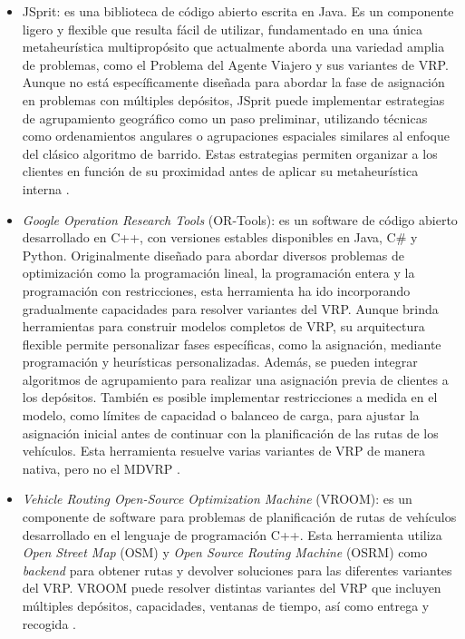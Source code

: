 \begin{itemize}
  \item JSprit: es una biblioteca de código abierto escrita en Java. Es un componente ligero y flexible que resulta fácil de utilizar, fundamentado en una única metaheurística multipropósito que actualmente aborda una variedad amplia de problemas, como el Problema del Agente Viajero y sus variantes de VRP. Aunque no está específicamente dise\~nada para abordar la fase de asignación en problemas con múltiples depósitos, JSprit puede implementar estrategias de agrupamiento geográfico como un paso preliminar, utilizando técnicas como ordenamientos angulares o agrupaciones espaciales similares al enfoque del clásico algoritmo de barrido. Estas estrategias permiten organizar a los clientes en función de su proximidad antes de aplicar su metaheurística interna  \parencite{jspritcontributorsJSpritJavabasedLibrary2026}.
  \item \textit{Google Operation Research Tools} (OR-Tools): es un software de código abierto desarrollado en C++, con versiones estables disponibles en Java, C\# y Python. Originalmente dise\~nado para abordar diversos problemas de optimización como la programación lineal, la programación entera y la programación con restricciones, esta herramienta ha ido incorporando gradualmente capacidades para resolver variantes del VRP. Aunque brinda herramientas para construir modelos completos de VRP, su arquitectura flexible permite personalizar fases específicas, como la asignación, mediante programación y heurísticas personalizadas. Además, se pueden integrar algoritmos de agrupamiento para realizar una asignación previa de clientes a los depósitos. También es posible implementar restricciones a medida en el modelo, como límites de capacidad o balanceo de carga, para ajustar la asignación inicial antes de continuar con la planificación de las rutas de los vehículos. Esta herramienta resuelve varias variantes de VRP de manera nativa, pero no el MDVRP \parencite{perronORTools}.
  \item \textit{Vehicle Routing Open-Source Optimization Machine} (VROOM): es un componente de software para problemas de planificación de rutas de vehículos desarrollado en el lenguaje de programación C++. Esta herramienta utiliza \textit{Open Street Map} (OSM) y \textit{Open Source Routing Machine} (OSRM) como \textit{backend} para obtener rutas y devolver soluciones para las diferentes variantes del VRP. VROOM puede resolver distintas variantes del VRP que incluyen múltiples depósitos, capacidades, ventanas de tiempo, así como entrega y recogida \parencite{karkulaComparisonCapabilitiesRecent2019}.

\end{itemize}
